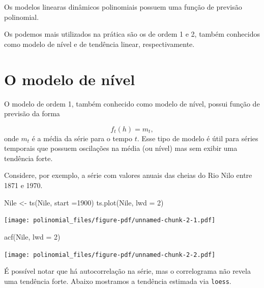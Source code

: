\documentclass[
  letterpaper,
  DIV=11,
  numbers=noendperiod]{scrreprt}
\newenvironment{Shaded}{\begin{snugshade}}{\end{snugshade}}
\newcommand{\AttributeTok}[1]{\textcolor[rgb]{0.40,0.45,0.13}{#1}}
\newcommand{\DecValTok}[1]{\textcolor[rgb]{0.68,0.00,0.00}{#1}}
\newcommand{\FunctionTok}[1]{\textcolor[rgb]{0.28,0.35,0.67}{#1}}
\newcommand{\NormalTok}[1]{\textcolor[rgb]{0.00,0.23,0.31}{#1}}
\newcommand{\OtherTok}[1]{\textcolor[rgb]{0.00,0.23,0.31}{#1}}
\newcommand{\SpecialCharTok}[1]{\textcolor[rgb]{0.37,0.37,0.37}{#1}}
\newcommand{\StringTok}[1]{\textcolor[rgb]{0.13,0.47,0.30}{#1}}
\begin{document}
Os modelos linearas dinâmicos polinomiais possuem uma função de previsão
polinomial.

Os podemos mais utilizados na prática são os de ordem 1 e 2, também
conhecidos como modelo de nível e de tendência linear, respectivamente.

\section{O modelo de nível}\label{o-modelo-de-nuxedvel}

O modelo de ordem 1, também conhecido como modelo de nível, possui
função de previsão da forma

\[f_t(h)=m_t,\] onde \(m_t\) é a média da série para o tempo \(t\). Esse
tipo de modelo é útil para séries temporais que possuem oscilações na
média (ou nível) mas sem exibir uma tendência forte.

Considere, por exemplo, a série com valores anuais das cheias do Rio
Nilo entre 1871 e 1970.

\begin{Shaded}
\begin{Highlighting}[]
\NormalTok{Nile }\OtherTok{\textless{}{-}} \FunctionTok{ts}\NormalTok{(Nile, }\AttributeTok{start =}\DecValTok{1900}\NormalTok{)}
\FunctionTok{ts.plot}\NormalTok{(Nile, }\AttributeTok{lwd =} \DecValTok{2}\NormalTok{)}
\end{Highlighting}
\end{Shaded}

\texttt{[image: polinomial\_files/figure-pdf/unnamed-chunk-2-1.pdf]}

\begin{Shaded}
\begin{Highlighting}[]
\FunctionTok{acf}\NormalTok{(Nile, }\AttributeTok{lwd =} \DecValTok{2}\NormalTok{)}
\end{Highlighting}
\end{Shaded}

\texttt{[image: polinomial\_files/figure-pdf/unnamed-chunk-2-2.pdf]}

É possível notar que há autocorrelação na série, mas o correlograma não
revela uma tendência forte. Abaixo mostramos a tendência estimada via
\texttt{loess}.

\begin{Shaded}
\end{Shaded}
\end{document}
